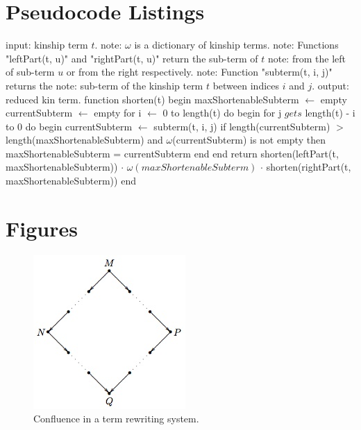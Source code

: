 \appendix
\chapter{Pseudocode Listings}
\begin{algorithm}[caption={Kinship Term Reduction}, label={algo:red}]
    input: kinship term $t$.
    note: $\omega$ is a dictionary of kinship terms.
    note: Functions "leftPart(t, u)" and "rightPart(t, u)" return the sub-term of $t$
    note: from the left of sub-term $u$ or from the right respectively.
    note: Function "subterm(t, i, j)" returns the
    note: sub-term of the kinship term $t$ between indices $i$ and $j$.
    output: reduced kin term.
    function shorten(t)
    begin
        maxShortenableSubterm $\gets$ empty
        currentSubterm $\gets$ empty
        for i $\gets$ 0 to length(t) do
        begin
            for j $gets$ length(t) - i to 0 do
            begin
                currentSubterm $\gets$ subterm(t, i, j)
                if length(currentSubterm) $>$ length(maxShortenableSubterm)
                    and $\omega$(currentSubterm) is not empty
                then
                    maxShortenableSubterm = currentSubterm
            end
        end
        return shorten(leftPart(t, maxShortenableSubterm))
               $\cdot$ $\omega(maxShortenableSubterm)$
               $\cdot$ shorten(rightPart(t, maxShortenableSubterm))
    end
\end{algorithm}

\chapter{Figures}
\begin{figure}[h!]
    \centering
    \includegraphics{figs/confluence.jpg}
    \caption{Confluence in a term rewriting system.}
    \label{fig:conf}
\end{figure}
